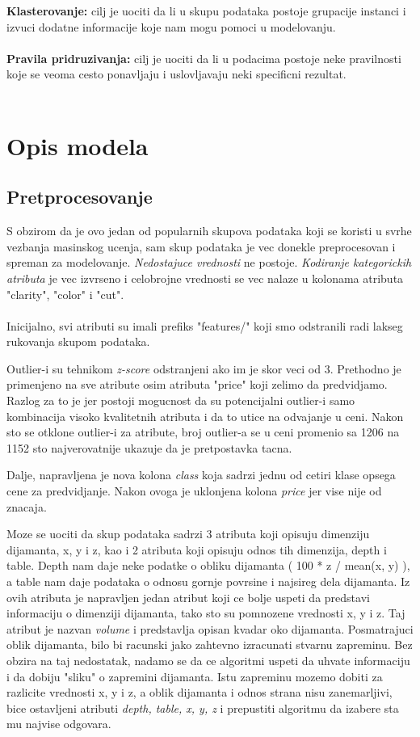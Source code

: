 \documentclass[10pt]{article}
\begin{document}
\textbf{Klasterovanje:} cilj je uociti da li u skupu podataka postoje grupacije instanci i izvuci dodatne informacije koje nam mogu pomoci u modelovanju.\\\\


\textbf{Pravila pridruzivanja:} cilj je uociti da li u podacima postoje neke pravilnosti koje se veoma cesto ponavljaju i uslovljavaju neki specificni rezultat.\\\\

\newpage
\section{Opis modela}
\subsection*{Pretprocesovanje}
S obzirom da je ovo jedan od popularnih skupova podataka koji se koristi u svrhe vezbanja masinskog ucenja, sam skup podataka je vec donekle preprocesovan i spreman za modelovanje. \textit{Nedostajuce vrednosti} ne postoje. \textit{Kodiranje kategorickih atributa} je vec izvrseno i celobrojne vrednosti se vec nalaze u kolonama atributa "clarity", "color" i "cut".\\\\


Inicijalno, svi atributi su imali prefiks "features/" koji smo odstranili radi lakseg rukovanja skupom podataka.

Outlier-i su tehnikom \textit{z-score} odstranjeni ako im je skor veci od 3. Prethodno je primenjeno na sve atribute osim atributa "price" koji zelimo da predvidjamo. Razlog za to je jer postoji mogucnost da su potencijalni outlier-i samo kombinacija visoko kvalitetnih atributa i da to utice na odvajanje u ceni. Nakon sto se otklone outlier-i za atribute, broj outlier-a se u ceni promenio sa 1206 na 1152 sto najverovatnije ukazuje da je pretpostavka tacna.

Dalje, napravljena je nova kolona \textit{class} koja sadrzi jednu od cetiri klase opsega cene za predvidjanje. Nakon ovoga je uklonjena kolona \textit{price} jer vise nije od znacaja.

Moze se uociti da skup podataka sadrzi 3 atributa koji opisuju dimenziju dijamanta, x, y i z, kao i 2 atributa koji opisuju odnos tih dimenzija, depth i table. Depth nam daje neke podatke o obliku dijamanta ( 100 * z / mean(x, y) ), a table nam daje podataka o odnosu gornje povrsine i najsireg dela dijamanta. Iz ovih atributa je napravljen jedan atribut koji ce bolje uspeti da predstavi informaciju o dimenziji dijamanta, tako sto su pomnozene vrednosti x, y i z. Taj atribut je nazvan \textit{volume} i predstavlja opisan kvadar oko dijamanta. Posmatrajuci oblik dijamanta, bilo bi racunski jako zahtevno izracunati stvarnu zapreminu. Bez obzira na taj nedostatak, nadamo se da ce algoritmi uspeti da uhvate informaciju i da dobiju "sliku" o zapremini dijamanta. Istu zapreminu mozemo dobiti za razlicite vrednosti x, y i z, a oblik dijamanta i odnos strana nisu zanemarljivi, bice ostavljeni atributi \textit{depth, table, x, y, z} i prepustiti algoritmu da izabere sta mu najvise odgovara.
\end{document}
